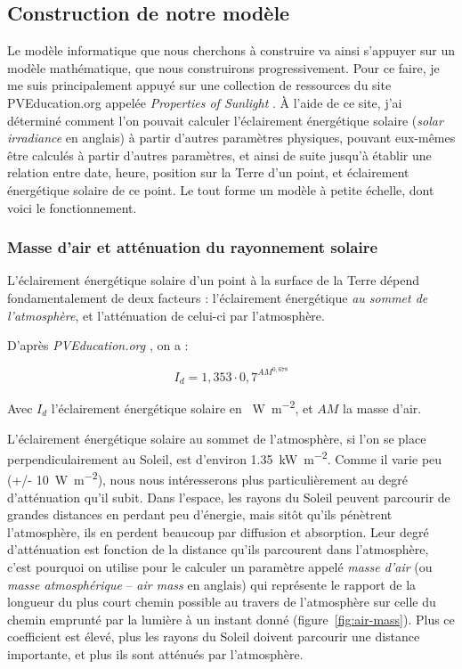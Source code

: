 \documentclass[12pt]{article}
\begin{document}
\subsection{Construction de notre modèle}

Le modèle informatique que nous cherchons à construire va ainsi s'appuyer sur un modèle mathématique, que nous construirons progressivement.
Pour ce faire, je me suis principalement appuyé sur une collection de ressources du site PVEducation.org appelée \emph{Properties of Sunlight} \cite{properties_of_sunlight}.
À l'aide de ce site, j'ai déterminé comment l'on pouvait calculer l'éclairement énergétique solaire (\textit{solar irradiance} en anglais) à partir d'autres paramètres physiques, pouvant eux-mêmes être calculés à partir d'autres paramètres, et ainsi de suite jusqu'à établir une relation entre date, heure, position sur la Terre d'un point, et éclairement énergétique solaire de ce point.
Le tout forme un modèle à petite échelle, dont voici le fonctionnement.

\subsubsection{Masse d'air et atténuation du rayonnement solaire}
L'éclairement énergétique solaire d'un point à la surface de la Terre dépend fondamentalement de deux facteurs : l'éclairement énergétique \emph{au sommet de l'atmosphère}, et l'atténuation de celui-ci par l'atmosphère. 

D'après \emph{PVEducation.org} \cite{pos_air_mass}, on a :

\[
	I_d = 1,353 \cdot 0,7^{{AM}^{0,678}}
\]

Avec $I_d$ l'éclairement énergétique solaire en \SI{}{\watt\per\square\meter}, et $AM$ la masse d'air.

L'éclairement énergétique solaire au sommet de l'atmosphère, si l'on se place perpendiculairement au Soleil, est d'environ \SI{1.35}{\kilo\watt\per\square\meter}.
Comme il varie peu (+/- \SI{10}{\watt\per\square\meter}), nous nous intéresserons plus particulièrement au degré d'atténuation qu'il subit.
Dans l'espace, les rayons du Soleil peuvent parcourir de grandes distances en perdant peu d'énergie, mais sitôt qu'ils pénètrent l'atmosphère, ils en perdent beaucoup par diffusion et absorption.
Leur degré d'atténuation est fonction de la distance qu'ils parcourent dans l'atmosphère, c'est pourquoi on utilise pour le calculer un paramètre appelé \emph{masse d'air} (ou \emph{masse atmosphérique} -- \textit{air mass} en anglais) \cite{air_mass_wiki} qui représente le rapport de la longueur du plus court chemin possible au travers de l'atmosphère sur celle du chemin emprunté par la lumière à un instant donné (figure~\ref{fig:air-mass}). Plus ce coefficient est élevé, plus les rayons du Soleil doivent parcourir une distance importante, et plus ils sont atténués par l'atmosphère.
\end{document}
